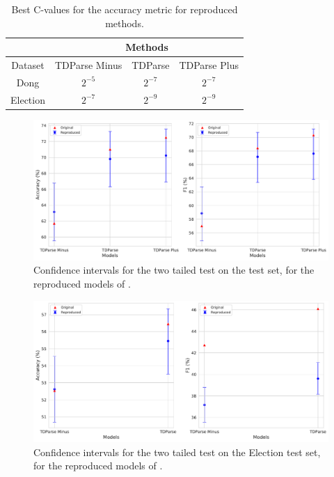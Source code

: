 \FloatBarrier
\begin{table}[h!]
    \centering
    \begin{tabular}{|c|c|c|c|}
        \hline
         & \multicolumn{3}{c|}{Methods} \\
        \hline
        Dataset & TDParse Minus & TDParse & TDParse Plus \\
        \hline
        Dong & $2^{-5}$ & $2^{-7}$ & $2^{-7}$ \\
        \hline
        Election & $2^{-7}$ & $2^{-9}$ & $2^{-9}$ \\
        \hline
    \end{tabular}
    \caption{Best C-values for the accuracy metric for \citet{wang-etal-2017-tdparse} reproduced methods.}
    \label{table:repro_rep_wang_c}
\end{table}


\begin{figure}[!h]
    \centering
    \includegraphics[scale=0.37]{images/reproducibility/wang/TDParse_Dong.pdf}
    \caption{Confidence intervals for the two tailed test on the \citet{dong-etal-2014-adaptive} test set, for the reproduced models of \citet{wang-etal-2017-tdparse}.}
    \label{fig:repro_wang_TDParse_Dong}
\end{figure}
\begin{figure}[!h]
    \centering
    \includegraphics[scale=0.37]{images/reproducibility/wang/TDParse_Election.pdf}
    \caption{Confidence intervals for the two tailed test on the \citet{wang-etal-2017-tdparse} Election test set, for the reproduced models of \citet{wang-etal-2017-tdparse}.}
    \label{fig:repro_wang_TDParse_Election}
\end{figure}

